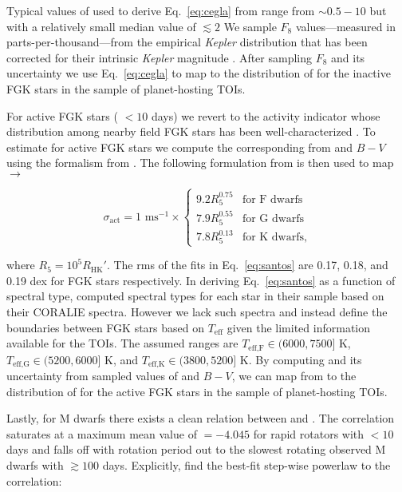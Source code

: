 \noindent Typical values of \sigact{} used to derive Eq.~\ref{eq:cegla} from \cite{saar03} range from
$\sim 0.5-10$ \mps{} but with a relatively small median value of $\lesssim 2$ 
We sample $F_8$ values---measured in parts-per-thousand---from the empirical \emph{Kepler} distribution
that has been corrected for their intrinsic \emph{Kepler} magnitude \citep{bastien13}. After sampling $F_8$ and its
uncertainty we use Eq.~\ref{eq:cegla} to map to the distribution of \sigact{} for the inactive FGK stars in
the sample of planet-hosting TOIs.

For active FGK stars (\prot{} $<10$ days) we revert to the \Rhk{} activity indicator \citep{noyes84} 
whose distribution among nearby field FGK stars
has been well-characterized \citep{henry96, santos00, wright04, hall07, isaacson10, lovis11}. To estimate \sigact{}
for active FGK stars we compute the corresponding \Rhk{} from \prot{} and $B-V$ using the formalism from
\cite{noyes84}. The following formulation from \cite{santos00} is then used to map \Rhk{} $\to$ \sigact{:}

\begin{equation}
  \sigma_{\text{act}} = 1 \text{ m} \text{s}^{-1} \times
  \begin{cases}
    9.2 R_5^{0.75} & \text{for F dwarfs} \\
    7.9 R_5^{0.55} & \text{for G dwarfs} \\
    7.8 R_5^{0.13} & \text{for K dwarfs},
  \end{cases} \label{eq:santos}
\end{equation}  

\noindent where $R_5 = 10^5 R_{\text{HK}}'$.
The rms of the fits in Eq.~\ref{eq:santos} are 0.17, 0.18, and 0.19 dex for FGK stars respectively.
In deriving Eq.~\ref{eq:santos} as a function of spectral type, \cite{santos00} computed
spectral types for each star in their sample based on their CORALIE spectra. However we lack such spectra and
instead define the boundaries between
FGK stars based on $T_{\text{eff}}$ given the limited information available for the TOIs. The assumed ranges
are $T_{\text{eff,F}} \in (6000,7500]$ K, $T_{\text{eff,G}} \in (5200,6000]$ K, and $T_{\text{eff,K}} \in (3800,5200]$ K.
      By computing \Rhk{} and its uncertainty from sampled values of \prot{} and $B-V$, we can map from \Rhk{} to the
      distribution of \sigact{} for the active FGK stars in the sample of planet-hosting TOIs.

Lastly, for M dwarfs there exists a clean relation between \Rhk{} and \prot{} \citep{astudillodefru17b}.
The correlation saturates at a maximum mean value of \Rhk{} $=-4.045$ for rapid rotators with \prot{} $< 10$
days and falls off with rotation period out to the slowest rotating observed M dwarfs with \prot{} $\gtrsim 100$
days. Explicitly, \cite{astudillodefru17b} find the best-fit step-wise powerlaw to the correlation:

